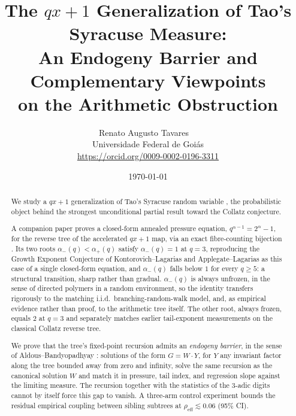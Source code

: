 \documentclass[11pt]{article}
\title{The $qx+1$ Generalization of Tao's Syracuse Measure:\\
An Endogeny Barrier and Complementary Viewpoints\\
on the Arithmetic Obstruction}
\author{Renato Augusto Tavares~{\small\href{mailto:dr.renatotavares@gmail.com}{\textcolor{black}{\faEnvelope}}}~\orcidlink{0009-0002-0196-3311}\\
\normalsize Universidade Federal de Goiás\\
\small \href{https://orcid.org/0009-0002-0196-3311}{https://orcid.org/0009-0002-0196-3311}}
\date{\today}
\theoremstyle{definition}
\theoremstyle{remark}
\begin{document}
\maketitle

\begin{abstract}
We study a $qx+1$ generalization of Tao's Syracuse random variable
\cite{Tao2022}, the probabilistic object behind the strongest
unconditional partial result toward the Collatz conjecture.

A companion paper proves a closed-form annealed pressure equation,
$q^{\alpha-1}=2^\alpha-1$, for the reverse tree of the accelerated
$qx+1$ map, via an exact fibre-counting bijection
\cite{PressureCompanion}. Its two roots $\alpha_-(q)<\alpha_+(q)$
satisfy $\alpha_-(q)=1$ at $q=3$, reproducing the Growth Exponent
Conjecture of Kontorovich--Lagarias and Applegate--Lagarias as this
case of a single closed-form equation, and $\alpha_-(q)$ falls below
$1$ for every $q\ge5$: a structural transition, sharp rather than
gradual. $\alpha_-(q)$ is always unfrozen, in the sense of
directed polymers in a random environment, so the identity transfers
rigorously to the matching i.i.d.\ branching-random-walk model, and,
as empirical evidence rather than proof, to the arithmetic tree
itself. The other root, always frozen, equals $2$ at $q=3$ and
separately matches earlier tail-exponent measurements on the classical
Collatz reverse tree.

We prove that the tree's fixed-point recursion admits an \emph{endogeny
barrier}, in the sense of Aldous--Bandyopadhyay
\cite{AldousBandyopadhyay2005}: solutions of the form $G=W\cdot Y$, for
$Y$ any invariant factor along the tree bounded away from zero and
infinity, solve the same recursion as the canonical solution $W$ and
match it in pressure, tail index, and regression slope against the
limiting measure. The
recursion together with the statistics of the $3$-adic digits cannot by
itself force this gap to vanish. A three-arm control experiment bounds
the residual empirical coupling between sibling subtrees at
$\rho_{\mathrm{eff}}\lesssim0.06$ (95\% CI).


\end{abstract}
\end{document}

